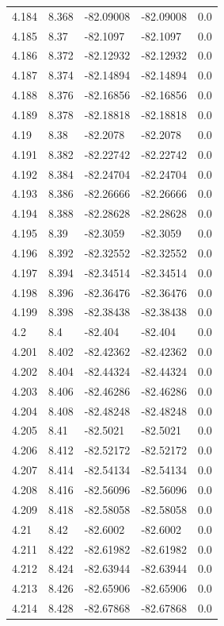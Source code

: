 \begin{tabular}{lllll}
4.184 & 8.368 & -82.09008 & -82.09008 & 0.0 \\
4.185 & 8.37 & -82.1097 & -82.1097 & 0.0 \\
4.186 & 8.372 & -82.12932 & -82.12932 & 0.0 \\
4.187 & 8.374 & -82.14894 & -82.14894 & 0.0 \\
4.188 & 8.376 & -82.16856 & -82.16856 & 0.0 \\
4.189 & 8.378 & -82.18818 & -82.18818 & 0.0 \\
4.19 & 8.38 & -82.2078 & -82.2078 & 0.0 \\
4.191 & 8.382 & -82.22742 & -82.22742 & 0.0 \\
4.192 & 8.384 & -82.24704 & -82.24704 & 0.0 \\
4.193 & 8.386 & -82.26666 & -82.26666 & 0.0 \\
4.194 & 8.388 & -82.28628 & -82.28628 & 0.0 \\
4.195 & 8.39 & -82.3059 & -82.3059 & 0.0 \\
4.196 & 8.392 & -82.32552 & -82.32552 & 0.0 \\
4.197 & 8.394 & -82.34514 & -82.34514 & 0.0 \\
4.198 & 8.396 & -82.36476 & -82.36476 & 0.0 \\
4.199 & 8.398 & -82.38438 & -82.38438 & 0.0 \\
4.2 & 8.4 & -82.404 & -82.404 & 0.0 \\
4.201 & 8.402 & -82.42362 & -82.42362 & 0.0 \\
4.202 & 8.404 & -82.44324 & -82.44324 & 0.0 \\
4.203 & 8.406 & -82.46286 & -82.46286 & 0.0 \\
4.204 & 8.408 & -82.48248 & -82.48248 & 0.0 \\
4.205 & 8.41 & -82.5021 & -82.5021 & 0.0 \\
4.206 & 8.412 & -82.52172 & -82.52172 & 0.0 \\
4.207 & 8.414 & -82.54134 & -82.54134 & 0.0 \\
4.208 & 8.416 & -82.56096 & -82.56096 & 0.0 \\
4.209 & 8.418 & -82.58058 & -82.58058 & 0.0 \\
4.21 & 8.42 & -82.6002 & -82.6002 & 0.0 \\
4.211 & 8.422 & -82.61982 & -82.61982 & 0.0 \\
4.212 & 8.424 & -82.63944 & -82.63944 & 0.0 \\
4.213 & 8.426 & -82.65906 & -82.65906 & 0.0 \\
4.214 & 8.428 & -82.67868 & -82.67868 & 0.0 \\

\end{tabular}
